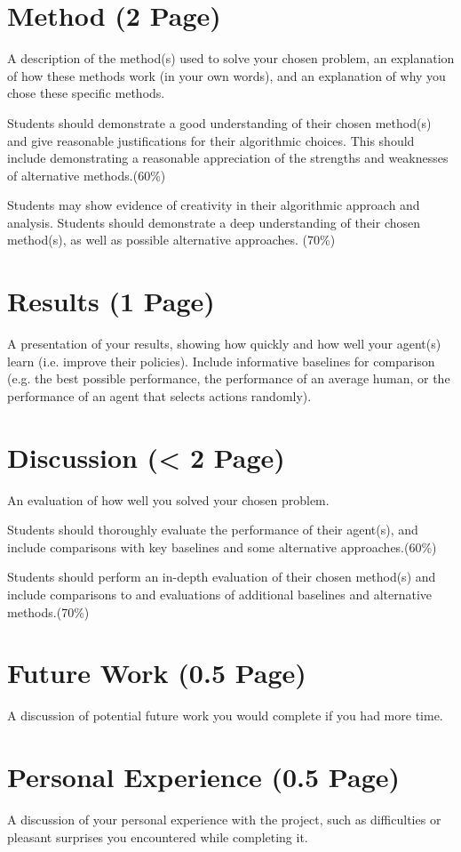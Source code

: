 \documentclass{article}
\begin{document}
\section{Method (2 Page)}
A description of the method(s) used to solve your chosen problem, an explanation of how these methods work (in your own words), and an explanation of why you chose these specific methods.

Students should demonstrate a good understanding of their chosen method(s) and give reasonable justifications for their algorithmic choices. This should include demonstrating a reasonable appreciation of the strengths and weaknesses of alternative methods.(60\%)

Students may show evidence of creativity in their algorithmic approach and analysis. Students should demonstrate a deep understanding of their chosen method(s), as well as possible alternative approaches. (70\%)

\section{Results (1 Page)}
A presentation of your results, showing how quickly and how well your agent(s) learn (i.e. improve their policies). Include informative baselines for comparison (e.g. the best possible performance, the performance of an average human, or the performance of an agent that selects actions randomly).

\section{Discussion (< 2 Page)}
An evaluation of how well you solved your chosen problem.

Students should thoroughly evaluate the performance of their agent(s), and include comparisons with key baselines and some alternative approaches.(60\%)

Students should perform an in-depth evaluation of their chosen method(s) and include comparisons to and evaluations of additional baselines and alternative methods.(70\%)


\section{Future Work (0.5 Page)}
A discussion of potential future work you would complete if you had more
time.

\section{Personal Experience (0.5 Page)}
A discussion of your personal experience with the project, such as difficulties or pleasant surprises you encountered while completing it.
\end{document}
